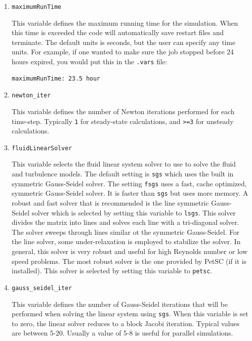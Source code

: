 \documentclass{article}
\begin{document}
\begin{enumerate}
\item {\tt maximumRunTime}

  This variable defines the maximum running time for the
  simulation.  When this time is exceeded the code will automatically
  save restart files and terminate.  The default units
  is seconds, but the user can specify any time units.  For
  example, if one wanted to make sure the job stopped before 24 hours
  expired, you would put this in the {\tt .vars} file:
\begin{verbatim}
maximumRunTime: 23.5 hour
\end{verbatim}

\item {\tt newton\_iter}
  
  This variable defines the number of Newton iterations performed
  for each time-step.  Typically {\tt 1} for steady-state calculations,
  and {\tt >=3} for unsteady calculations.

\item {\tt fluidLinearSolver }

  This variable selects the fluid linear system solver to use to solve
  the fluid and turbulence models.  The default setting is {\tt sgs}
  which uses the built in symmetric Gauss-Seidel solver.  The setting
  {\tt fsgs} uses a fast, cache optimized, symmetric Gauss-Seidel
  solver.  It is faster than {\tt sgs} but uses more memory.  A robust
  and fast solver that is recommended is the line symmetric
  Gauss-Seidel solver which is selected by setting this variable to
  {\tt lsgs}.  This solver divides the matrix into lines and solves
  each line with a tri-diagonal solver.  The solver sweeps through
  lines similar ot the symmetric Gauss-Seidel.  For the line solver,
  some under-relaxation is employed to stabilize the solver.  In general,
  this solver is very robust and useful for high Reynolds number or
  low speed problems.  The most robust solver is the one provided by
  PetSC (if it is installed).  This solver is selected by setting this
  variable to {\tt petsc}.

\item {\tt gauss\_seidel\_iter}

  This variable defines the number of Gauss-Seidel iterations that
  will be performed when solving the linear system using {\tt sgs}.
  When this variable is set to zero, the linear solver reduces to a
  block Jacobi iteration.  Typical values are between 5-20.  Usually a
  value of 5-8 is useful for parallel simulations.


\end{enumerate}
\end{document}
